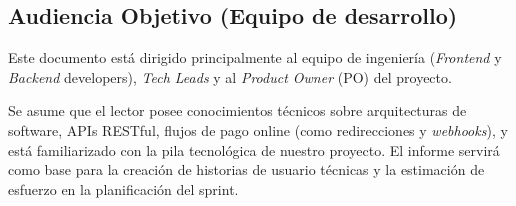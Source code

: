     \subsection{Audiencia Objetivo (Equipo de desarrollo)}
    Este documento está dirigido principalmente al equipo de ingeniería (\emph{Frontend} y \emph{Backend} developers), 
    \emph{Tech Leads} y al \emph{Product Owner} (PO) del proyecto.

Se asume que el lector posee conocimientos técnicos sobre arquitecturas de software, APIs RESTful, flujos de pago online 
(como redirecciones y \emph{webhooks}), y está familiarizado con la pila tecnológica de nuestro proyecto. El informe servirá 
como base para la creación de historias de usuario técnicas y la estimación de esfuerzo en la planificación del sprint.